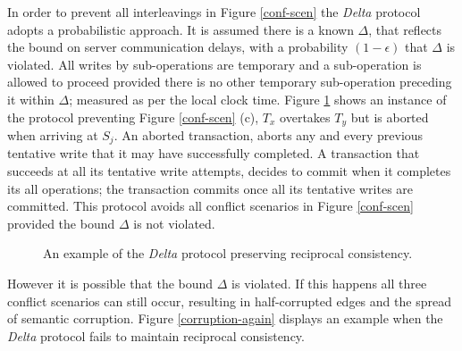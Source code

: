 \documentclass[sigplan,10pt]{acmart}
\begin{document}
In order to prevent all interleavings in Figure \ref{conf-scen} the \emph{Delta} protocol adopts a probabilistic approach. It is assumed there is a known $\Delta$, that reflects the bound on server communication delays, with a probability $(1-\epsilon)$ that $\Delta$ is violated. All writes by sub-operations are temporary and a sub-operation is allowed to proceed provided there is no other temporary sub-operation preceding it within $\Delta$; measured as per the local clock time. Figure \ref{delta-abort} shows an instance of the protocol preventing Figure \ref{conf-scen} (c), $T_x$ overtakes $T_y$ but is aborted when arriving at $S_j$. An aborted transaction, aborts any and every previous tentative write that it may have successfully completed. A transaction that succeeds at all its tentative write attempts, decides to commit when it completes its all operations; the transaction commits once all its tentative writes are committed. This protocol avoids all conflict scenarios in Figure \ref{conf-scen} provided the bound  $\Delta$ is not violated.

\begin{figure}[ht]
  \centering
  \caption{An example of the \emph{Delta} protocol preserving reciprocal consistency.}
  \label{delta-abort}
\end{figure}

However it is possible that the bound $\Delta$ is violated. If this happens all three conflict scenarios can still occur, resulting in half-corrupted edges and the spread of semantic corruption. Figure \ref{corruption-again} displays an example when the \emph{Delta} protocol fails to maintain reciprocal consistency.
\end{document}
